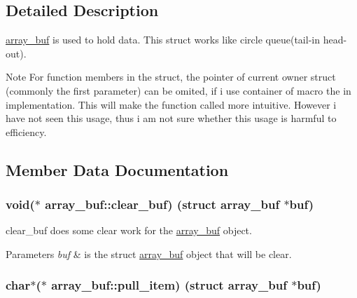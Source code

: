 \subsection{Detailed Description}
\hyperlink{structarray__buf}{array\+\_\+buf} is used to hold data. This struct works like circle queue(tail-\/in head-\/out). 

\begin{DoxyNote}{Note}
For function members in the struct, the pointer of current owner struct (commonly the first parameter) can be omited, if i use \textquotesingle{}container of\textquotesingle{} macro the in implementation. This will make the function called more intuitive. However i have not seen this usage, thus i am not sure whether this usage is harmful to efficiency. 
\end{DoxyNote}


\subsection{Member Data Documentation}
\hypertarget{structarray__buf_af0c784332c37e64228d9ee80cc0bdaed}{}
\subsubsection[{clear\+\_\+buf}]{\setlength{\rightskip}{0pt plus 5cm}void($\ast$ array\+\_\+buf\+::clear\+\_\+buf) (struct {\bf array\+\_\+buf} $\ast$buf)}\label{structarray__buf_af0c784332c37e64228d9ee80cc0bdaed}


clear\+\_\+buf does some clear work for the \hyperlink{structarray__buf}{array\+\_\+buf} object. 


\begin{DoxyParams}{Parameters}
{\em buf} & is the struct \hyperlink{structarray__buf}{array\+\_\+buf} object that will be clear. \\
\hline
\end{DoxyParams}
\hypertarget{structarray__buf_a0b51cb106346823cf7fb861d1d2b5359}{}
\subsubsection[{pull\+\_\+item}]{\setlength{\rightskip}{0pt plus 5cm}char$\ast$($\ast$ array\+\_\+buf\+::pull\+\_\+item) (struct {\bf array\+\_\+buf} $\ast$buf)}\label{structarray__buf_a0b51cb106346823cf7fb861d1d2b5359}


